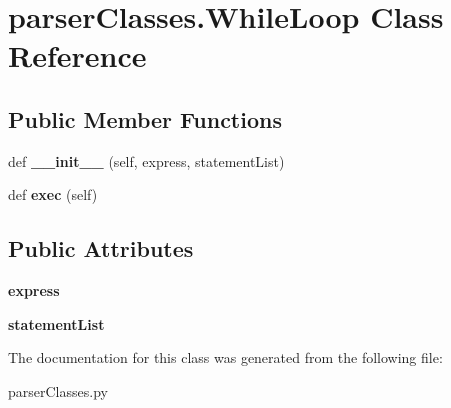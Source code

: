\hypertarget{classparser_classes_1_1_while_loop}{}\section{parser\+Classes.\+While\+Loop Class Reference}
\label{classparser_classes_1_1_while_loop}
\subsection*{Public Member Functions}
\begin{DoxyCompactItemize}
\item 
\mbox{\label{classparser_classes_1_1_while_loop_a886ffecb17b87a41ec66691dead4da00}} 
def {\bfseries \+\_\+\+\_\+init\+\_\+\+\_\+} (self, express, statement\+List)
\item 
\mbox{\label{classparser_classes_1_1_while_loop_a8f1705d74c2e71c1cb37398d33261442}} 
def {\bfseries exec} (self)
\end{DoxyCompactItemize}
\subsection*{Public Attributes}
\begin{DoxyCompactItemize}
\item 
\mbox{\label{classparser_classes_1_1_while_loop_aadd614a12b85a9536c5cb231eb60a579}} 
{\bfseries express}
\item 
\mbox{\label{classparser_classes_1_1_while_loop_aef24cd7f0ead40a82bbad44af58890c1}} 
{\bfseries statement\+List}
\end{DoxyCompactItemize}


The documentation for this class was generated from the following file\+:\begin{DoxyCompactItemize}
\item 
parser\+Classes.\+py\end{DoxyCompactItemize}
